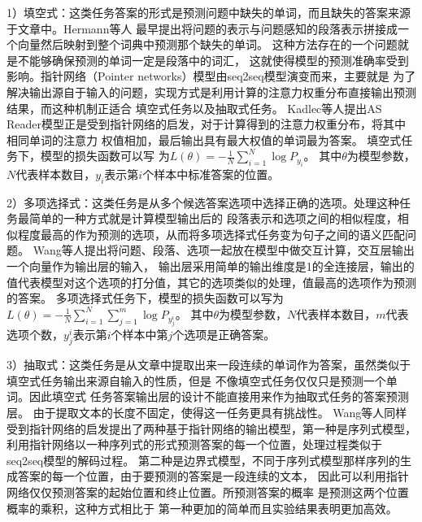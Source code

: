 1）填空式：这类任务答案的形式是预测问题中缺失的单词，而且缺失的答案来源于文章中。Hermann等人
最早提出将问题的表示与问题感知的段落表示拼接成一个向量然后映射到整个词典中预测那个缺失的单词。
这种方法存在的一个问题就是不能够确保预测的单词一定是段落中的词汇，
这就使得模型的预测准确率受到影响。指针网络（Pointer networks）模型由seq2seq模型演变而来，主要就是
为了解决输出源自于输入的问题，实现方式是利用计算的注意力权重分布直接输出预测结果，而这种机制正适合
填空式任务以及抽取式任务。
Kadlec等人提出AS Reader模型正是受到指针网络的启发，对于计算得到的注意力权重分布，将其中相同单词的注意力
权值相加，最后输出具有最大权值的单词最为答案。
填空式任务下，模型的损失函数可以写
为$L(\theta)=-\displaystyle\frac{1}{N}\sum_{i=1}^{N}\log P_{y_i}$。
其中$\theta$为模型参数，$N$代表样本数目，$y_i$表示第$i$个样本中标准答案的位置。

2）多项选择式：这类任务是从多个候选答案选项中选择正确的选项。处理这种任务最简单的一种方式就是计算模型输出后的
段落表示和选项之间的相似程度，相似程度最高的作为预测的选项，从而将多项选择式任务变为句子之间的语义匹配问题。
Wang等人提出将问题、段落、选项一起放在模型中做交互计算，交互层输出一个向量作为输出层的输入，
输出层采用简单的输出维度是1的全连接层，输出的值代表模型对这个选项的打分值，其它的选项类似的处理，值最高的选项作为预测的答案。
多项选择式任务下，模型的损失函数可以写为
$L(\theta)=-\displaystyle\frac{1}{N}\sum_{i=1}^{N}\sum_{j=1}^{m}\log P_{y_{j}^i}$。
其中$\theta$为模型参数，$N$代表样本数目，$m$代表选项个数，$y_{j}^i$表示第$i$个样本中第$j$个选项是正确答案。

3）抽取式：这类任务是从文章中提取出来一段连续的单词作为答案，虽然类似于填空式任务输出来源自输入的性质，但是
不像填空式任务仅仅只是预测一个单词。因此填空式
任务答案输出层的设计不能直接用来作为抽取式任务的答案预测层。
由于提取文本的长度不固定，使得这一任务更具有挑战性。
Wang等人同样受到指针网络的启发提出了两种基于指针网络的输出模型，第一种是序列式模型，利用指针网络以一种序列式的形式预测答案的每一个位置，处理过程类似于seq2seq模型的解码过程。
第二种是边界式模型，不同于序列式模型那样序列的生成答案的每一个位置，由于要预测的答案是一段连续的文本，
因此可以利用指针网络仅仅预测答案的起始位置和终止位置。所预测答案的概率
是预测这两个位置概率的乘积，这种方式相比于
第一种更加的简单而且实验结果表明更加高效。


